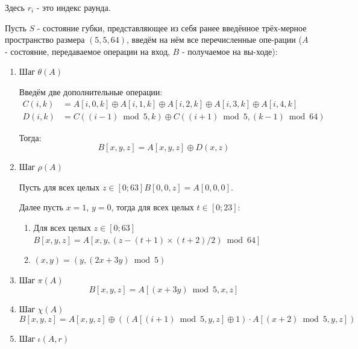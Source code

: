 \documentclass[a4paper]{article}
\begin{document}
  Здесь $r_i$ - это индекс раунда.

  Пусть $S$ - состояние губки, представляющее из себя ранее введённое
  трёх-мерное пространство размера $(5, 5, 64)$, введём на нём все перечисленные
  опе-рации ($A$ - состояние, передаваемое операции на вход, $B$ - получаемое
  на вы-ходе):
  \begin{enumerate}
    \item {
      Шаг $\theta(A)$

      Введём две дополнительные операции:
      \begin{align}
        C(i, k) &= A[i, 0, k] \oplus A[i, 1, k] \oplus A[i, 2, k] \oplus A[i, 3, k] \oplus A[i, 4, k] \\
        D(i, k) &= C((i - 1)\bmod 5, k) \oplus C((i + 1)\bmod 5, (k - 1)\bmod 64)
      \end{align}

      Тогда:
      \begin{equation}
        B[x, y, z] = A[x, y, z] \oplus D(x, z)
      \end{equation}
    }
    \item {
      Шаг $\rho(A)$

      Пусть для всех целых $z \in [0; 63] B[0, 0, z] = A[0, 0, 0]$.

      Далее пусть $x = 1$, $y = 0$, тогда для всех целых $t \in [0; 23]$:
      \begin{enumerate}
        \item Для всех целых $z \in [0; 63]$\\$B[x, y, z] = A[x, y, (z - (t + 1)\times (t + 2) / 2)\bmod 64]$
        \item $(x, y) = (y, (2x + 3y)\bmod 5)$
      \end{enumerate}
    }
    \item {
      Шаг $\pi(A)$
      \begin{equation}
        B[x, y, z] = A[(x + 3y)\bmod 5, x, z]
      \end{equation}
    }
    \item {
      Шаг $\chi(A)$
      \begin{equation}
        B[x, y, z] = A[x, y, z] \oplus ((A[(i + 1)\bmod 5, y, z] \oplus 1) \cdot A[(x + 2)\bmod 5, y, z])
      \end{equation}
    }
    \item {
      Шаг $\iota(A, r)$

}
\end{enumerate}
\end{document}
